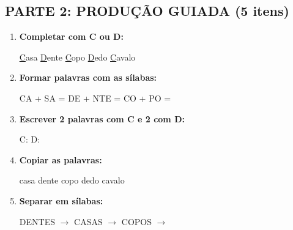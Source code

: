 \begin{exercicio}
\subsection*{PARTE 2: PRODUÇÃO GUIADA (5 itens)}

\begin{enumerate}[resume]
  \item \textbf{Completar com C ou D:}
  \begin{center}
  \underline{C}asa \quad \underline{D}ente \quad \underline{C}opo \quad \underline{D}edo \quad \underline{C}avalo
  \end{center}

  \item \textbf{Formar palavras com as sílabas:}
  \begin{center}
  CA + SA = \underline{\hspace{2cm}} \quad DE + NTE = \underline{\hspace{2cm}} \quad CO + PO = \underline{\hspace{2cm}}
  \end{center}

  \item \textbf{Escrever 2 palavras com C e 2 com D:}
  \begin{center}
  C: \underline{\hspace{3cm}} \underline{\hspace{3cm}} \quad D: \underline{\hspace{3cm}} \underline{\hspace{3cm}}
  \end{center}

  \item \textbf{Copiar as palavras:}
  \begin{center}
  casa \quad dente \quad copo \quad dedo \quad cavalo
  \end{center}

  \item \textbf{Separar em sílabas:}
  \begin{center}
  DENTES $\rightarrow$ \underline{\hspace{1cm}} \underline{\hspace{1cm}} \quad CASAS $\rightarrow$ \underline{\hspace{1cm}} \underline{\hspace{1cm}} \quad COPOS $\rightarrow$ \underline{\hspace{1cm}} \underline{\hspace{1cm}}
  \end{center}
\end{enumerate}


\end{exercicio}
